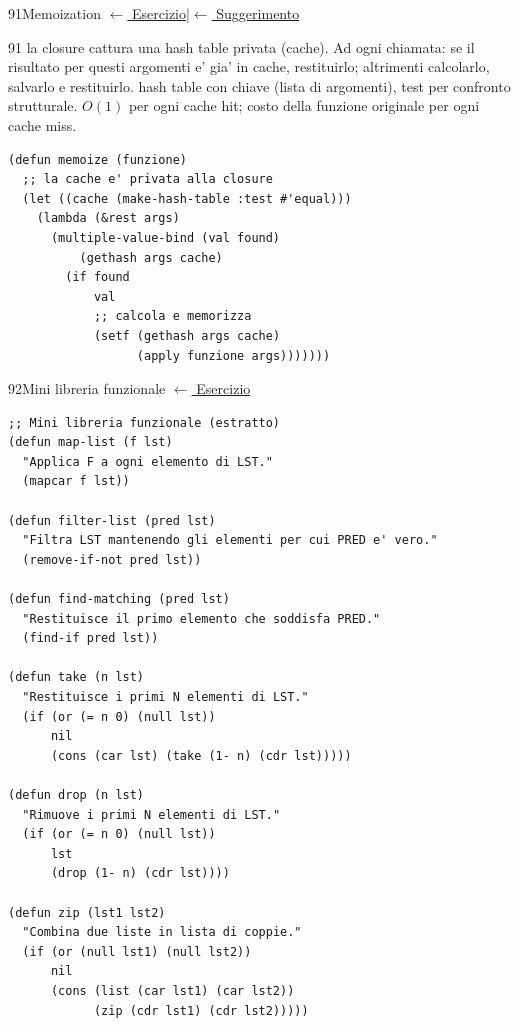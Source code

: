 \label{sol:91}
\begin{solbox}{91}{Memoization}
\small\color{black!55}\hyperref[ex:91]{$\leftarrow$ Esercizio}\enspace\textcolor{black!30}{|}\enspace\hyperref[hint:91]{$\leftarrow$ Suggerimento}\normalsize\color{black}
\begin{ragionamentoBox}{91}
 la closure cattura una hash table privata (cache).
Ad ogni chiamata: se il risultato per questi argomenti e' gia'
in cache, restituirlo; altrimenti calcolarlo, salvarlo e restituirlo.
 hash table con chiave  (lista di argomenti),
test  per confronto strutturale.
 $O(1)$ per ogni cache hit;
costo della funzione originale per ogni cache miss.
\end{ragionamentoBox}
\begin{lstlisting}
(defun memoize (funzione)
  ;; la cache e' privata alla closure
  (let ((cache (make-hash-table :test #'equal)))
    (lambda (&rest args)
      (multiple-value-bind (val found)
          (gethash args cache)
        (if found
            val
            ;; calcola e memorizza
            (setf (gethash args cache)
                  (apply funzione args)))))))
\end{lstlisting}
\end{solbox}

\label{sol:92}
\begin{solbox}{92}{Mini libreria funzionale}
\small\color{black!55}\hyperref[ex:92]{$\leftarrow$ Esercizio}\normalsize\color{black}
\begin{lstlisting}
;; Mini libreria funzionale (estratto)
(defun map-list (f lst)
  "Applica F a ogni elemento di LST."
  (mapcar f lst))

(defun filter-list (pred lst)
  "Filtra LST mantenendo gli elementi per cui PRED e' vero."
  (remove-if-not pred lst))

(defun find-matching (pred lst)
  "Restituisce il primo elemento che soddisfa PRED."
  (find-if pred lst))

(defun take (n lst)
  "Restituisce i primi N elementi di LST."
  (if (or (= n 0) (null lst))
      nil
      (cons (car lst) (take (1- n) (cdr lst)))))

(defun drop (n lst)
  "Rimuove i primi N elementi di LST."
  (if (or (= n 0) (null lst))
      lst
      (drop (1- n) (cdr lst))))

(defun zip (lst1 lst2)
  "Combina due liste in lista di coppie."
  (if (or (null lst1) (null lst2))
      nil
      (cons (list (car lst1) (car lst2))
            (zip (cdr lst1) (cdr lst2)))))
\end{lstlisting}
\end{solbox}

